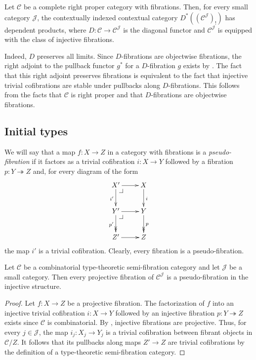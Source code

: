 \documentclass[reqno]{amsart}
\makeatletter
\theoremstyle{definition}
\theoremstyle{remark}
\newcommand{\scat}[1]{\mathcal{#1}}
\numberwithin{figure}{section}
\newcommand{\pb}[1][dr]{\save*!/#1-1.2pc/#1:(-1,1)@^{|-}\restore}
\makeatother
\begin{document}
\begin{example}
Let $\scat{C}$ be a complete right proper category with fibrations.
Then, for every small category $\scat{J}$, the contextually indexed contextual category $D^*((\scat{C}^\scat{J})_!)$ has dependent products, where $D : \scat{C} \to \scat{C}^\scat{J}$ is the diagonal functor and $\scat{C}^\scat{J}$ is equipped with the class of injective fibrations.

Indeed, $D$ preserves all limits.
Since $D$-fibrations are objectwise fibrations, the right adjoint to the pullback functor $g^*$ for a $D$-fibration $g$ exists by \cite[Theorem~2.12]{comp-fact-tor}.
The fact that this right adjoint preserves fibrations is equivalent to the fact that injective trivial cofibrations are stable under pullbacks along $D$-fibrations.
This follows from the facts that $\scat{C}$ is right proper and that $D$-fibrations are objectwise fibrations.
\end{example}

\subsection{Initial types}

We will say that a map $f : X \to Z$ in a category with fibrations is a \emph{pseudo-fibration} if it factors as a trivial cofibration $i : X \to Y$ followed by a fibration $p : Y \twoheadrightarrow Z$ and, for every diagram of the form
\[ \xymatrix{ X' \ar[r] \ar[d]_{i'} \pb         & X \ar[d]^i \\
              Y' \ar[r] \ar@{->>}[d]_{p'} \pb   & Y \ar@{->>}[d]^p \\
              Z' \ar[r]                         & Z
            } \]
the map $i'$ is a trivial cofibration.
Clearly, every fibration is a pseudo-fibration.

\begin{lem}
Let $\scat{C}$ be a combinatorial type-theoretic semi-fibration category and let $\scat{J}$ be a small category.
Then every projective fibration of $\scat{C}^\scat{J}$ is a pseudo-fibration in the injective structure.
\end{lem}
\begin{proof}
Let $f : X \to Z$ be a projective fibration.
The factorization of $f$ into an injective trivial cofibration $i : X \to Y$ followed by an injective fibration $p : Y \twoheadrightarrow Z$ exists since $\scat{C}$ is combinatorial.
By , injective fibrations are projective.
Thus, for every $j \in \scat{J}$, the map $i_j : X_j \to Y_j$ is a trivial cofibration between fibrant objects in $\scat{C}/Z$.
It follows that its pullbacks along maps $Z' \to Z$ are trivial cofibrations by the definition of a type-theoretic semi-fibration category.
\end{proof}
\end{document}
